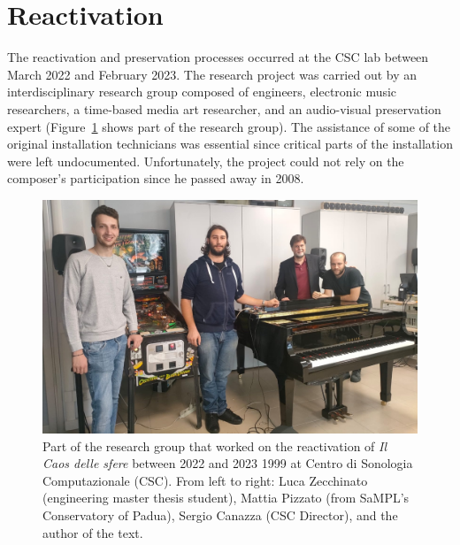 \section{Reactivation}
The reactivation and preservation processes occurred at the CSC lab between March 2022 and February 2023. The research project was carried out by an interdisciplinary research group composed of engineers, electronic music researchers, a time-based media art researcher, and an audio-visual preservation expert (Figure~\ref{fig:ab-ilcaosdellesfere-group02} shows part of the research group). The assistance of some of the original installation technicians was essential since critical parts of the installation were left undocumented. Unfortunately, the project could not rely on the composer's participation since he passed away in 2008.

\begin{figure}[!h]
    \centering
    \includegraphics[width=\linewidth]{chapters/appendix/b/image/figb-ilcaosdellesfere-group02.jpg}
    \caption{Part of the research group that worked on the reactivation of \textit{Il Caos delle sfere} between 2022 and 2023 1999 at Centro di Sonologia Computazionale (CSC). From left to right: Luca Zecchinato (engineering master thesis student), Mattia Pizzato (from SaMPL's Conservatory of Padua), Sergio Canazza (CSC Director), and the author of the text.}
    \label{fig:ab-ilcaosdellesfere-group02}
\end{figure}

